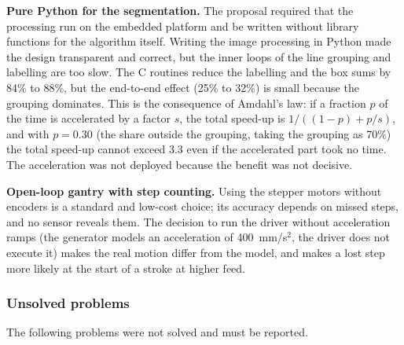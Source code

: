         \textbf{Pure Python for the segmentation.}
        The proposal required that the processing run on the embedded platform and be written without library functions for the algorithm itself.
        Writing the image processing in Python made the design transparent and correct, but the inner loops of the line grouping and labelling are too slow.
        The C routines reduce the labelling and the box sums by 84\% to 88\%, but the end-to-end effect (25\% to 32\%) is small because the grouping dominates.
        This is the consequence of Amdahl's law: if a fraction $p$ of the time is accelerated by a factor $s$, the total speed-up is $1/((1-p)+p/s)$, and with $p=0.30$ (the share outside the grouping, taking the grouping as 70\%) the total speed-up cannot exceed $3.3$ even if the accelerated part took no time.
        The acceleration was not deployed because the benefit was not decisive.

        \textbf{Open-loop gantry with step counting.}
        Using the stepper motors without encoders is a standard and low-cost choice; its accuracy depends on missed steps, and no sensor reveals them.
        The decision to run the driver without acceleration ramps (the generator models an acceleration of 400~mm/s$^2$, the driver does not execute it) makes the real motion differ from the model, and makes a lost step more likely at the start of a stroke at higher feed.


    \subsubsection{Unsolved problems}
    \label{sec:dis-unsolved}

        The following problems were not solved and must be reported.

